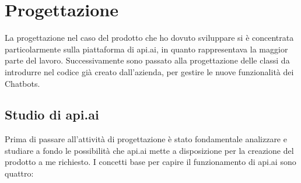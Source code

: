 
\chapter{Progettazione}
\label{cap:progettazione}

La progettazione nel caso del prodotto che ho dovuto sviluppare si è concentrata particolarmente sulla piattaforma di api.ai, in quanto rappresentava la maggior parte del lavoro. Successivamente sono passato alla progettazione delle classi da introdurre nel codice già creato dall'azienda, per gestire le nuove funzionalità dei \glspl{Chatbot}.

\section{Studio di api.ai}
Prima di passare all'attività di progettazione è stato fondamentale analizzare e studiare a fondo le possibilità che api.ai mette a disposizione per la creazione del prodotto a me richiesto. I concetti base per capire il funzionamento di api.ai sono quattro:
